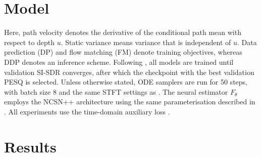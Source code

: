 \section{Model}
Here, path velocity denotes the derivative of the conditional path mean with respect to depth $u$. Static variance means variance that is independent of $u$. Data prediction (DP) and flow matching (FM) denote training objectives, whereas \ac{DDP} denotes an inference scheme.
Following \cite{jukic2024schr}, all models are trained until validation SI-SDR converges, after which the checkpoint with the best validation PESQ is selected. Unless otherwise stated, \ac{ODE} samplers are run for 50 steps, with batch size 8 and the same STFT settings as \cite{richterInvestigatingTrainingObjectives2025}.
The neural estimator $F_\theta$ employs the NCSN++ architecture \citep{song2021sde} using the same parameterisation described in \cite{richter2023speech}. All experiments use the time-domain auxiliary loss \citep{jukic2024schr}.

\section{Results}

